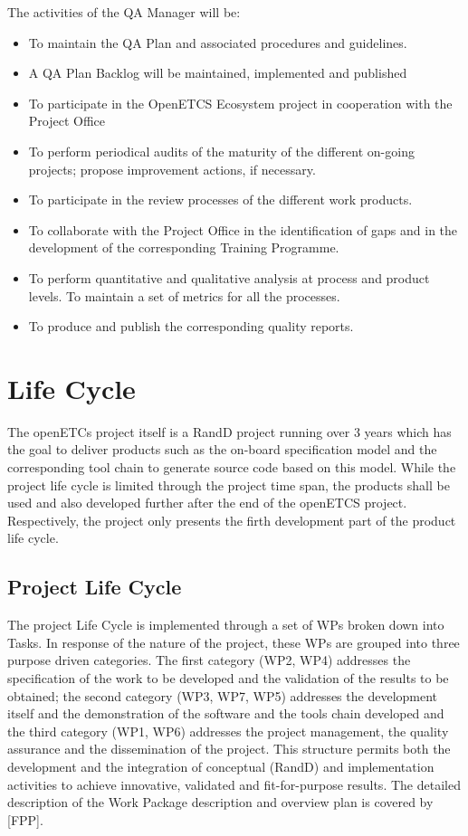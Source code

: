 \documentclass{template/openetcs_article}
\begin{document}
The activities of the QA Manager will be:
\begin{itemize}
\item To maintain the QA Plan and associated procedures and guidelines. 
\item A QA Plan Backlog will be maintained, implemented and published
\item To participate in the OpenETCS Ecosystem project in cooperation with the Project Office
\item To perform periodical audits of the maturity of the different on-going projects; propose improvement actions, if necessary.
\item To participate in the review processes of the different work products.
\item To collaborate with the Project Office in the identification of gaps and in the development of the corresponding Training Programme.
\item To perform quantitative and qualitative analysis at process and product levels. To maintain a set of metrics for all the processes.
\item To produce and publish the corresponding quality reports.
\end{itemize}


\newpage
\section{Life Cycle}

The openETCs project itself is a \gls{RandD} project running over 3 years which has the goal to deliver products such as the on-board specification model and the corresponding tool chain to generate source code based on this model. While the project life cycle is limited through the project time span, the products shall be used and also developed further after the end of the openETCS project. Respectively, the project only presents the firth development part of the product life cycle.

\subsection{Project Life Cycle }

The project Life Cycle is implemented through a set of WPs broken down into Tasks. In response of the nature of the project, these WPs are grouped into three purpose driven categories. The first category (WP2, WP4) addresses the specification of the work to be developed and the validation of the results to be obtained; the second category (WP3, WP7, WP5) addresses the development itself and the demonstration of the software and the tools chain developed and the third category (WP1, WP6) addresses the project management, the quality assurance and the dissemination of the project.
This structure permits both the development and the integration of conceptual (\gls{RandD}) and implementation activities to achieve innovative, validated and fit-for-purpose results.
The detailed description of the Work Package description and overview plan is covered by [FPP].  
\end{document}
